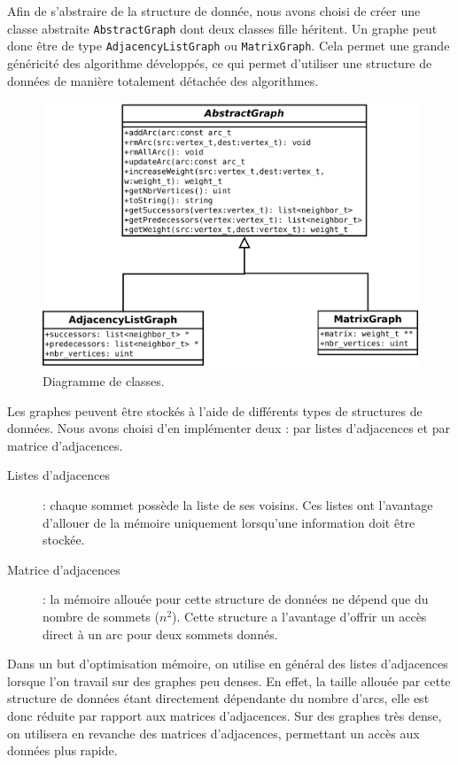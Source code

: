 Afin de s'abstraire de la structure de donnée, nous avons choisi de créer une classe abstraite \texttt{AbstractGraph} dont deux classes fille héritent. Un graphe peut donc être de type \texttt{AdjacencyListGraph} ou \texttt{MatrixGraph}. Cela permet une grande généricité des algorithme développés, ce qui permet d'utiliser une structure de données de manière totalement détachée des algorithmes.
\begin{figure}[t]
\begin{center}
\includegraphics[width=\textwidth]{files/diag_class}
\end{center}
\caption{Diagramme de classes.}
\end{figure}

\FloatBarrier

Les graphes peuvent être stockés à l'aide de différents types de structures de données. Nous avons choisi d'en implémenter deux :  par listes d'adjacences et par matrice d'adjacences.
\begin{description}
\item[Listes d'adjacences] : chaque sommet possède la liste de ses voisins. Ces listes ont l'avantage d'allouer de la mémoire uniquement lorsqu'une information doit être stockée. 
\item[Matrice d'adjacences] : la mémoire allouée pour cette structure de données ne dépend que du nombre de sommets ($n^2$). Cette structure a l'avantage d'offrir un accès direct à un arc pour deux sommets donnés.
\end{description}

Dans un but d'optimisation mémoire, on utilise en général des listes d'adjacences lorsque l'on travail sur des graphes peu denses. En effet, la taille allouée par cette structure de données étant directement dépendante du nombre d'arcs, elle est donc réduite par rapport aux matrices d'adjacences. Sur des graphes très dense, on utilisera en revanche des matrices d'adjacences, permettant un accès aux données plus rapide. 

